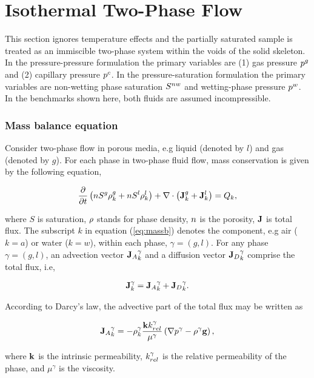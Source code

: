 %
\section{Isothermal Two-Phase Flow}
This section ignores temperature effects and the partially saturated sample is treated as an immiscible two-phase system within the voids of the solid skeleton. In the pressure-pressure formulation the primary variables are (1) gas pressure $p^g$ and (2) capillary pressure $p^c$. In the pressure-saturation formulation the primary variables are non-wetting phase saturation ${S}^{nw}$ and wetting-phase pressure ${p}^{w}$. In the benchmarks shown here, both fluids are assumed incompressible.

\subsubsection*{Mass balance equation}
Consider two-phase flow in porous media, e.g liquid (denoted by $l$) and gas (denoted by $g$). For each phase in two-phase fluid flow, mass conservation is given by the following equation,

\begin{align}
\pD{}{t}\left(\poro S^g\dens_k^g+\poro S^l\dens_k^l\right)+\nabla \cdot \left( \FlxDf_k^g+\FlxDf_k^l\right)=Q_k,
\label{eq:massb}
\end{align}

where $S$ is saturation, $\rho$ stands for phase density, $n$ is the porosity, $\mathbf{J}$ is total flux. The subscript $k$ in equation (\ref{eq:massb}) denotes the component, e.g air ($k=a$) or water ($k=w$), within each phase, $\gamma=(g,l)$. For any phase $\gamma=(g,l)$, an advection vector ${{\mathbf{J}}_A}_k^{\gamma}$ and a diffusion vector  ${{\mathbf{J}}_D}_k^{\gamma}$ comprise the total flux, i.e,

\begin{align}
\FlxDf_k^{\gamma}={{\FlxDf}_A}_k^{\gamma}+{{\FlxDf}_D}_k^{\gamma}.
\label{eq:tflx}
\end{align}

According to Darcy's law, the advective part of the total flux may be written as

\begin{align}
{{\FlxDf}_A}_k^{\gamma}=-\dens_k^{\gamma}\dfrac{\perm \RelKa^{\gamma}}{\mu^{\gamma}}\left(\nabla \pres^{\gamma}-\dens^{\gamma} \mathbf g\right),
\label{eq:flx_dc}
\end{align}

where $\mathbf k$ is the intrinsic permeability, $k_{rel}^{\gamma}$ is the relative permeability of the phase, and $\mu^{\gamma}$ is the viscosity.

